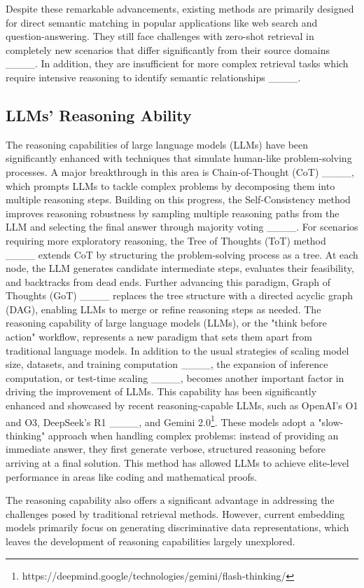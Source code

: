 Despite these remarkable advancements, existing methods are primarily designed for direct semantic matching in popular applications like web search and question-answering. They still face challenges with zero-shot retrieval in completely new scenarios that differ significantly from their source domains ____. In addition, they are insufficient for more complex retrieval tasks which require intensive reasoning to identify semantic relationships ____. 

\subsection{LLMs' Reasoning Ability} 
The reasoning capabilities of large language models (LLMs) have been significantly enhanced with techniques that simulate human-like problem-solving processes. A major breakthrough in this area is Chain-of-Thought (CoT) ____, which prompts LLMs to tackle complex problems by decomposing them into multiple reasoning steps. Building on this progress, the Self-Consistency method improves reasoning robustness by sampling multiple reasoning paths from the LLM and selecting the final answer through majority voting ____. For scenarios requiring more exploratory reasoning, the Tree of Thoughts (ToT) method ____ extends CoT by structuring the problem-solving process as a tree. At each node, the LLM generates candidate intermediate steps, evaluates their feasibility, and backtracks from dead ends. Further advancing this paradigm, Graph of Thoughts (GoT) ____ replaces the tree structure with a directed acyclic graph (DAG), enabling LLMs to merge or refine reasoning steps as needed. The reasoning capability of large language models (LLMs), or the "think before action" workflow, represents a new paradigm that sets them apart from traditional language models. In addition to the usual strategies of scaling model size, datasets, and training computation ____, the expansion of inference computation, or test-time scaling ____, becomes another important factor in driving the improvement of LLMs. This capability has been significantly enhanced and showcased by recent reasoning-capable LLMs, such as OpenAI's O1 and O3, DeepSeek's R1 ____, and Gemini 2.0\footnote{https://deepmind.google/technologies/gemini/flash-thinking/}. These models adopt a "slow-thinking" approach when handling complex problems: instead of providing an immediate answer, they first generate verbose, structured reasoning before arriving at a final solution. This method has allowed LLMs to achieve elite-level performance in areas like coding and mathematical proofs. 

The reasoning capability also offers a significant advantage in addressing the challenges posed by traditional retrieval methods. However, current embedding models primarily focus on generating discriminative data representations, which leaves the development of reasoning capabilities largely unexplored. 



